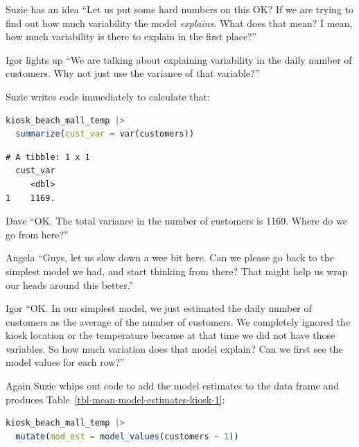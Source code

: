 \documentclass[
  12pt,
  letterpaper,
  DIV=11,
  numbers=noendperiod]{scrreprt}
\begin{document}
Suzie has an idea ``Let us put some hard numbers on this OK? If we are
trying to find out how much variability the model \emph{explains}. What
does that mean? I mean, how much variability is there to explain in the
first place?''

Igor lights up ``We are talking about explaining variability in the
daily number of customers. Why not just use the variance of that
variable?''

Suzie writes code immediately to calculate that:

\begin{lstlisting}[language=R]
kiosk_beach_mall_temp |> 
  summarize(cust_var = var(customers))
\end{lstlisting}

\begin{lstlisting}
# A tibble: 1 x 1
  cust_var
     <dbl>
1    1169.
\end{lstlisting}

Dave ``OK. The total variance in the number of customers is 1169. Where
do we go from here?''

Angela ``Guys, let us slow down a wee bit here. Can we please go back to
the simplest model we had, and start thinking from there? That might
help us wrap our heads around this better.''

Igor ``OK. In our simplest model, we just estimated the daily number of
customers as the average of the number of customers. We completely
ignored the kiosk location or the temperature because at that time we
did not have those variables. So how much variation does that model
explain? Can we first see the model values for each row?''

Again Suzie whips out code to add the model estimates to the data frame
and produces Table~\ref{tbl-mean-model-estimates-kiosk-1}:

\begin{lstlisting}[language=R]
kiosk_beach_mall_temp |> 
  mutate(mod_est = model_values(customers ~ 1))
\end{lstlisting}
\end{document}

